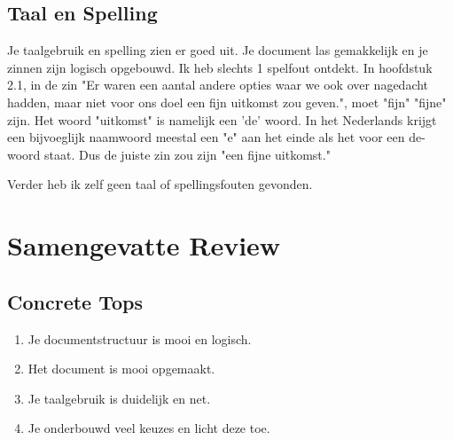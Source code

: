 \documentclass[a4paper]{report}
\begin{document}
\section{Taal en Spelling}
Je taalgebruik en spelling zien er goed uit. Je document las gemakkelijk en je zinnen zijn logisch opgebouwd.
Ik heb slechts 1 spelfout ontdekt. In hoofdstuk 2.1, in de zin "Er waren een aantal andere opties waar we ook over nagedacht hadden, maar niet voor ons doel een fijn uitkomst zou geven.", moet "fijn" "fijne" zijn.
Het woord "uitkomst" is namelijk een 'de' woord. In het Nederlands krijgt een bijvoeglijk naamwoord meestal een "e" aan het einde als het voor een de-woord staat. Dus de juiste zin zou zijn "een fijne uitkomst." 
\par\smallskip
Verder heb ik zelf geen taal of spellingsfouten gevonden.

\chapter{Samengevatte Review}
\section{Concrete Tops}

\begin{enumerate}
  \item Je documentstructuur is mooi en logisch. 
  \item Het document is mooi opgemaakt.
  \item Je taalgebruik is duidelijk en net.
  \item Je onderbouwd veel keuzes en licht deze toe.
\end{enumerate}
\end{document}
